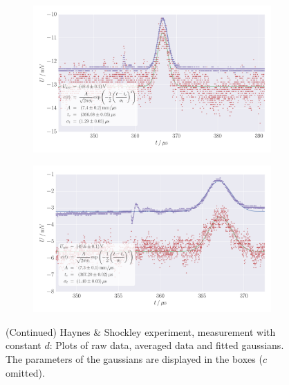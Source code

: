 \begin{figure}
    \centering
    \begin{subfigure}[b]{\pltw}
        \includegraphics[width=1.0\linewidth]{figures/haynes_shockley_raw_U_39}
        \caption{}
        \label{fig:h_s_raw_U_39}
    \end{subfigure}
    \begin{subfigure}[b]{\pltw}
        \includegraphics[width=1.0\linewidth]{figures/haynes_shockley_raw_U_65}
        \caption{}
        \label{fig:h_s_raw_U_65}
    \end{subfigure}
    \caption{
        (Continued)
        Haynes \& Shockley experiment, measurement with constant $d$:
        Plots of raw data, averaged data and fitted gaussians. 
        The parameters of the gaussians are displayed in the boxes 
        ($c$ omitted).
        }
    \label{fig:h_s_raw_plots_U_39_65}
\end{figure}
